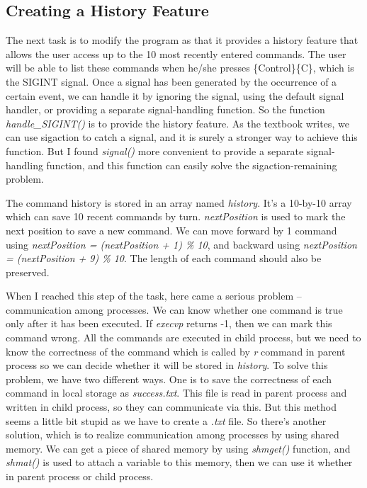 \documentclass[a4paper, 11pt]{article}
\begin{document}
\subsection{Creating a History Feature}
The next task is to modify the program as that it provides a history feature that allows the user access up to the 10 most recently entered commands. The user will be able to list these commands when he/she presses \{Control\}\{C\}, which is the SIGINT signal. Once a signal has been generated by the occurrence of a certain event, we can handle it by ignoring the signal, using the default signal handler, or providing a separate signal-handling function. So the function \emph{handle\_SIGINT()} is to provide the history feature. As the textbook writes, we can use sigaction to catch a signal, and it is surely a stronger way to achieve this function. But I found \emph{signal()} more convenient to provide a separate signal-handling function, and this function can easily solve the sigaction-remaining problem.

The command history is stored in an array named \emph{history}. It's a 10-by-10 array which can save 10 recent commands by turn. \emph{nextPosition} is used to mark the next position to save a new command. We can move forward by 1 command using \emph{nextPosition = (nextPosition + 1) \% 10}, and backward using \emph{nextPosition = (nextPosition + 9) \% 10}. The length of each command should also be preserved.

When I reached this step of the task, here came a serious problem -- communication among processes. We can know whether one command is true only after it has been executed. If \emph{execvp} returns -1, then we can mark this command wrong. All the commands are executed in child process, but we need to know the correctness of the command which is called by \emph{r} command in parent process so we can decide whether it will be stored in \emph{history}. To solve this problem, we have two different ways. One is to save the correctness of each command in local storage as \emph{success.txt}. This file is read in parent process and written in child process, so they can communicate via this. But this method seems a little bit stupid as we have to create a \emph{.txt} file. So there's another solution, which is to realize communication among processes by using shared memory. We can get a piece of shared memory by using \emph{shmget()} function, and \emph{shmat()} is used to attach a variable to this memory, then we can use it whether in parent process or child process.
\end{document}

